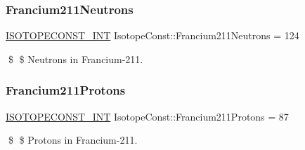 \subsubsection{\texorpdfstring{Francium211\+Neutrons}{Francium211Neutrons}}
{\footnotesize\ttfamily \mbox{\hyperlink{group___isotope_const-_macros_ga5f18360b3e99483a35c32d789e62621c}{I\+S\+O\+T\+O\+P\+E\+C\+O\+N\+S\+T\+\_\+\+I\+NT}} Isotope\+Const\+::\+Francium211\+Neutrons = 124}

\$ \$ Neutrons in Francium-\/211. \mbox{\label{group___isotope_const-_francium-_fr211_gadc45fec3a7e7ca648985f6bb2ea94ebe}} 
\subsubsection{\texorpdfstring{Francium211\+Protons}{Francium211Protons}}
{\footnotesize\ttfamily \mbox{\hyperlink{group___isotope_const-_macros_ga5f18360b3e99483a35c32d789e62621c}{I\+S\+O\+T\+O\+P\+E\+C\+O\+N\+S\+T\+\_\+\+I\+NT}} Isotope\+Const\+::\+Francium211\+Protons = 87}

\$ \$ Protons in Francium-\/211. 
